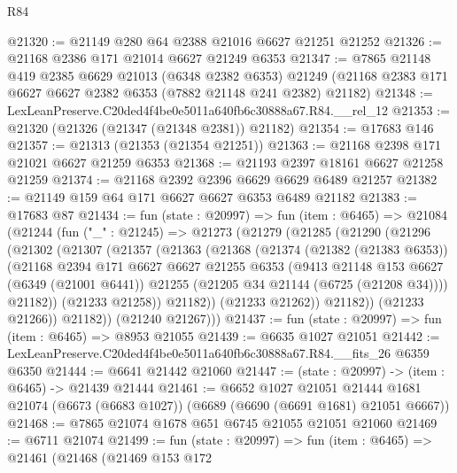 \begin{lexlean}{R84}
\begin{coremodule}
@21320 := @21149 @280 @64 @2388 @21016 @6627 @21251 @21252
@21326 := @21168 @2386 @171 @21014 @6627 @21249 @6353
@21347 := @7865
    @21148
    @419
    @2385
    @6629
    @21013
    (@6348 @2382 @6353)
    @21249
    (@21168 @2383 @171 @6627 @6627 @2382 @6353 (@7882 @21148 @241 @2382) @21182)
@21348 := LexLeanPreserve.C20ded4f4be0e5011a640fb6c30888a67.R84.__rel_12
@21353 := @21320 (@21326 (@21347 (@21348 @2381)) @21182)
@21354 := @17683 @146
@21357 := @21313 (@21353 (@21354 @21251))
@21363 := @21168 @2398 @171 @21021 @6627 @21259 @6353
@21368 := @21193 @2397 @18161 @6627 @21258 @21259
@21374 := @21168 @2392 @2396 @6629 @6629 @6489 @21257
@21382 := @21149 @159 @64 @171 @6627 @6627 @6353 @6489 @21182
@21383 := @17683 @87
@21434 := fun (state : @20997) =>
  fun (item : @6465) =>
  @21084
    (@21244
      (fun ("_" : @21245) =>
      @21273
        (@21279
          (@21285
            (@21290
              (@21296
                (@21302
                  (@21307
                    (@21357
                      (@21363
                        (@21368
                          (@21374
                            (@21382 (@21383 @6353))
                            (@21168
                              @2394
                              @171
                              @6627
                              @6627
                              @21255
                              @6353
                              (@9413
                                @21148
                                @153
                                @6627
                                (@6349 (@21001 @6441))
                                @21255
                                (@21205 @34 @21144 (@6725 (@21208 @34))))
                              @21182))
                          (@21233 @21258))
                        @21182))
                    (@21233 @21262))
                  @21182))
              (@21233 @21266))
            @21182))
        (@21240 @21267)))
@21437 := fun (state : @20997) => fun (item : @6465) => @8953 @21055
@21439 := @6635 @1027 @21051
@21442 := LexLeanPreserve.C20ded4f4be0e5011a640fb6c30888a67.R84.__fits_26 @6359 @6350
@21444 := @6641 @21442 @21060
@21447 := (state : @20997) -> (item : @6465) -> @21439 @21444
@21461 := @6652
    @1027
    @21051
    @21444
    @1681
    @21074
    (@6673 (@6683 @1027))
    (@6689 (@6690 (@6691 @1681) @21051 @6667))
@21468 := @7865 @21074 @1678 @651 @6745 @21055 @21051 @21060
@21469 := @6711 @21074
@21499 := fun (state : @20997) =>
  fun (item : @6465) =>
  @21461
    (@21468
      (@21469
        @153
        @172

\end{coremodule}
\end{lexlean}
